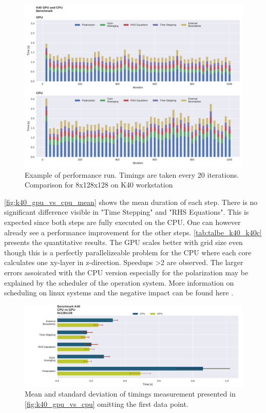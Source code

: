 \documentclass[master.tex]{subfiles}
\begin{document}
\begin{figure}[!hbtp]
    \centering
    \includegraphics[width=\linewidth]{pdfs/k40CPUvsGPU_full.pdf}
    \caption{\small Example of performance run. Timings are taken every 20 iterations. Comparison for 8x128x128 on K40 workstation}
    \label{fig:k40_gpu_vs_cpu}
\end{figure}

\autoref{fig:k40_gpu_vs_cpu_mean} shows the mean duration of each step. There is no significant difference visible in "Time Stepping" and "RHS Equations". This is expected since both steps are fully executed on the CPU. One can however already see a performance improvement for the other steps. \autoref{tab:talbe_k40_k40c} presents the quantitative results. The GPU scales better with grid size even though this is a perfectly parallelizeable problem for the CPU where each core calculates one xy-layer in z-direction. Speedups >2 are observed.
The larger errors assoicated with the CPU version especially for the polarization may be explained by the scheduler of the operation system. More information on scheduling on linux systems and the negative impact can be found here \cite{Scheduling-Linux}.

\begin{figure}[!hbtp]
    \centering
    \includegraphics[width=\linewidth]{pdfs/k40CPUvsGPU_means.pdf}
    \caption{\small Mean and standard deviation of timings measurement presented in \autoref{fig:k40_gpu_vs_cpu} omitting the first data point.}
    \label{fig:k40_gpu_vs_cpu_mean}
\end{figure}
\end{document}

